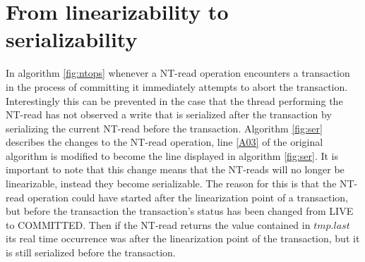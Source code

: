 \begin{figure} [htb]
\end{figure}





\section{From linearizability to serializability}

In algorithm \ref{fig:ntops} whenever a NT-read operation encounters
a transaction in the process of committing it immediately attempts to abort the transaction.
Interestingly this can be prevented
in the case that the thread performing the NT-read has not observed a write that is serialized after the transaction
by serializing the current NT-read before the transaction.
Algorithm \ref{fig:ser} describes the changes to the NT-read operation, line \ref{A03} of
the original algorithm is modified to become the line displayed in algorithm \ref{fig:ser}.
It is important to note that this change means that the NT-reads will no longer be linearizable,
instead they become serializable.
The reason for this is that the NT-read operation could have started after the linearization point
of a transaction, but before the transaction the transaction's status has been changed from LIVE to
COMMITTED.
Then if the NT-read returns the value contained in $\mathit{tmp.last}$ its real time occurrence was
after the linearization point of the transaction, but it is still serialized before the transaction.










